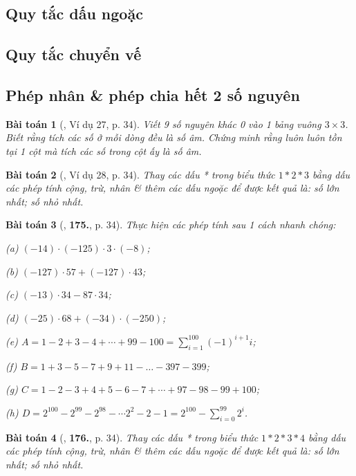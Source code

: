 \documentclass{article}
\numberwithin{equation}{section}
\newtheorem{baitoan}{Bài toán}[section]
\begin{document}
\subsection{Quy tắc dấu ngoặc}

\subsection{Quy tắc chuyển vế}

\subsection{Phép nhân \& phép chia hết 2 số nguyên}
\begin{baitoan}[\cite{Binh_Toan_6_tap_1}, Ví dụ 27, p. 34]
	Viết 9 số nguyên khác 0 vào 1 bảng vuông $3\times 3$. Biết rằng tích các số ở mỗi dòng đều là số âm. Chứng minh rằng luôn luôn tồn tại 1 cột mà tích các số trong cột ấy là số âm.
\end{baitoan}

\begin{baitoan}[\cite{Binh_Toan_6_tap_1}, Ví dụ 28, p. 34]
	Thay các dấu * trong biểu thức $1*2*3$ bằng dấu các phép tính cộng, trừ, nhân \& thêm các dấu ngoặc để được kết quả là: số lớn nhất; số nhỏ nhất.
\end{baitoan}

\begin{baitoan}[\cite{Binh_Toan_6_tap_1}, \textbf{175.}, p. 34]
	Thực hiện các phép tính sau 1 cách nhanh chóng:
	\begin{enumerate*}
		\item[(a)] $(-14)\cdot(-125)\cdot3\cdot(-8)$;
		\item[(b)] $(-127)\cdot 57 + (-127)\cdot 43$;
		\item[(c)] $(-13)\cdot 34 - 87\cdot 34$;
		\item[(d)] $(-25)\cdot 68 + (-34)\cdot(-250)$;
		\item[(e)] $A = 1 - 2 + 3 - 4 + \cdots + 99 - 100 = \sum_{i=1}^{100} (-1)^{i+1} i$;
		\item[(f)] $B = 1 + 3 - 5 - 7 + 9 + 11 - \ldots - 397 - 399$;
		\item[(g)] $C = 1 - 2 - 3 + 4 + 5 - 6 - 7 + \cdots + 97 - 98 - 99 + 100$;
		\item[(h)] $D = 2^{100} - 2^{99} - 2^{98} - \cdots 2^2 - 2 - 1 = 2^{100} - \sum_{i=0}^{99} 2^i$.
	\end{enumerate*}
\end{baitoan}

\begin{baitoan}[\cite{Binh_Toan_6_tap_1}, \textbf{176.}, p. 34]
	Thay các dấu * trong biểu thức $1*2*3*4$ bằng dấu các phép tính cộng, trừ, nhân \& thêm các dấu ngoặc để được kết quả là: số lớn nhất; số nhỏ nhất.
\end{baitoan}
\end{document}
